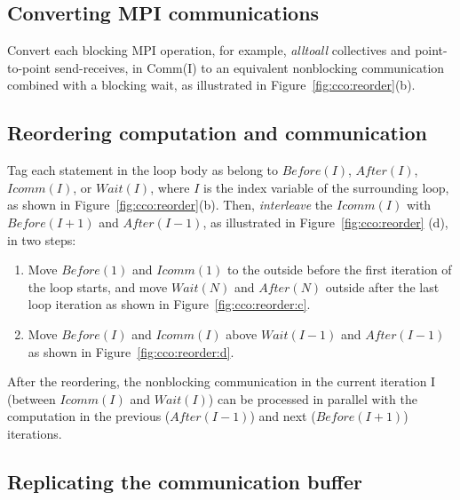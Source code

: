 \subsection{Converting MPI communications}

Convert each blocking MPI operation, for example, {\em alltoall} collectives
and point-to-point send-receives, in Comm(I) to an equivalent
nonblocking communication combined with a blocking wait, as illustrated in
Figure~\ref{fig:cco:reorder}(b).


\subsection{Reordering computation and communication}

Tag each statement in the loop body as belong to $Before(I)$,
$After(I)$, $Icomm(I)$, or $Wait(I)$, where $I$ is the index
variable of the surrounding loop, as shown in Figure~\ref{fig:cco:reorder}(b).
Then, \emph{interleave} the $Icomm(I)$ with $Before(I+1)$ and $After(I-1)$, as illustrated in
Figure~\ref{fig:cco:reorder} (d), in two steps:

\begin{enumerate}

\item Move $Before(1)$ and $Icomm(1)$ to the outside before the first
  iteration of the loop starts, and move $Wait(N)$ and $After(N)$
  outside after the last loop iteration as shown in
  Figure~\ref{fig:cco:reorder:c}.

\item Move $Before(I)$ and $Icomm(I)$ above $Wait(I-1)$ and
  $After(I-1)$ as shown in Figure~\ref{fig:cco:reorder:d}.

\end{enumerate}

After the reordering, the nonblocking communication in the current
iteration I (between $Icomm(I)$ and $Wait(I)$) can be processed in
parallel with the computation in the previous ($After(I-1)$) and next
($Before(I+1)$) iterations.


\subsection{Replicating the communication buffer}

